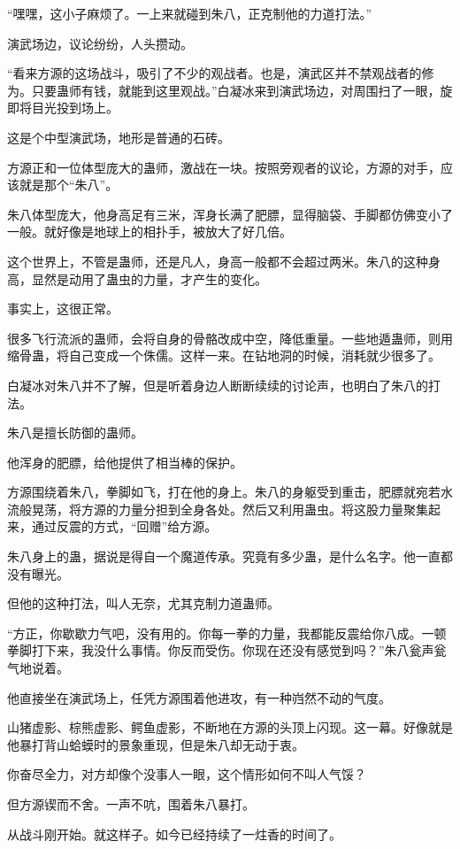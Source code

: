 \begin{this_body}
“嘿嘿，这小子麻烦了。一上来就碰到朱八，正克制他的力道打法。”

演武场边，议论纷纷，人头攒动。

“看来方源的这场战斗，吸引了不少的观战者。也是，演武区并不禁观战者的修为。只要蛊师有钱，就能到这里观战。”白凝冰来到演武场边，对周围扫了一眼，旋即将目光投到场上。

这是个中型演武场，地形是普通的石砖。

方源正和一位体型庞大的蛊师，激战在一块。按照旁观者的议论，方源的对手，应该就是那个“朱八”。

朱八体型庞大，他身高足有三米，浑身长满了肥膘，显得脑袋、手脚都仿佛变小了一般。就好像是地球上的相扑手，被放大了好几倍。

这个世界上，不管是蛊师，还是凡人，身高一般都不会超过两米。朱八的这种身高，显然是动用了蛊虫的力量，才产生的变化。

事实上，这很正常。

很多飞行流派的蛊师，会将自身的骨骼改成中空，降低重量。一些地遁蛊师，则用缩骨蛊，将自己变成一个侏儒。这样一来。在钻地洞的时候，消耗就少很多了。

白凝冰对朱八并不了解，但是听着身边人断断续续的讨论声，也明白了朱八的打法。

朱八是擅长防御的蛊师。

他浑身的肥膘，给他提供了相当棒的保护。

方源围绕着朱八，拳脚如飞，打在他的身上。朱八的身躯受到重击，肥膘就宛若水流般晃荡，将方源的力量分担到全身各处。然后又利用蛊虫。将这股力量聚集起来，通过反震的方式，“回赠”给方源。

朱八身上的蛊，据说是得自一个魔道传承。究竟有多少蛊，是什么名字。他一直都没有曝光。

但他的这种打法，叫人无奈，尤其克制力道蛊师。

“方正，你歇歇力气吧，没有用的。你每一拳的力量，我都能反震给你八成。一顿拳脚打下来，我没什么事情。你反而受伤。你现在还没有感觉到吗？”朱八瓮声瓮气地说着。

他直接坐在演武场上，任凭方源围着他进攻，有一种岿然不动的气度。

山猪虚影、棕熊虚影、鳄鱼虚影，不断地在方源的头顶上闪现。这一幕。好像就是他暴打背山蛤蟆时的景象重现，但是朱八却无动于衷。

你奋尽全力，对方却像个没事人一眼，这个情形如何不叫人气馁？

但方源锲而不舍。一声不吭，围着朱八暴打。

从战斗刚开始。就这样子。如今已经持续了一炷香的时间了。


\end{this_body}
